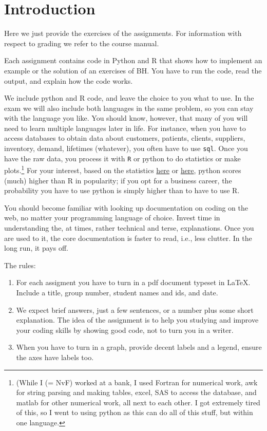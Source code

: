 \section{Introduction}

Here we just provide the exercises of the assignments.  For information with respect to grading we refer to the  course manual.

Each assignment contains code in Python and R that shows how to implement an example or the solution of an exercises of BH. You have to run the code, read the output, and explain how the code works.

We include python and R code, and leave the choice to you what to use.
In the exam we will also include both languages in the same problem, so you can stay with the language you like.
You should know, however, that many of you will need to learn multiple languages later in life.
For instance, when you have to access databases to obtain data about customers, patients, clients, suppliers, inventory, demand, lifetimes (whatever), you often have to use \texttt{sql}.
Once you have the raw data, you process it with \texttt{R} or python to do statistics or make plots.\footnote{(While I (= NvF) worked at a bank, I used Fortran for numerical work, awk for string parsing and making tables, excel, SAS to access the database, and matlab for other numerical work, all next to each other.
I got extremely tired of this, so I went to using python as this can do all of this stuff, but within one language.}
For your interest, based on the statistics \href{https://www.tiobe.com/tiobe-index/}{here} or \href{https://www.northeastern.edu/graduate/blog/most-popular-programming-languages/}{here}, python scores (much) higher than R in popularity; if you opt for a business career, the probability you have to use python is simply higher than to have to use R.

You should become familiar with looking up documentation on coding on the web, no matter your programming language of choice. Invest time in understanding the, at times, rather technical and terse, explanations.  Once you are used to it, the core documentation is faster to read, i.e., less clutter. In the long run, it pays off.



The rules:
\begin{enumerate}
\item For each assigment you have to turn in a pdf document typeset in \LaTeX{}. Include a title, group number, student names and ids, and date.
\item We expect brief answers, just a few sentences, or a number plus some short explanation. The idea of the assignment is to help you studying and improve your coding skills by showing good code, not to turn you in a writer.
\item When you have to turn in a graph, provide decent labels and a legend, ensure the axes have labels too.
\end{enumerate}
